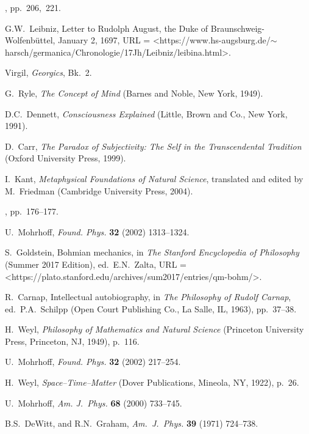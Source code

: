 \documentclass[smallextended]{svjour3}
\begin{document}
\begin{thebibliography}{99}
 \cite{Falk2007}, pp.\ 206,~221.

 G.W.\ Leibniz, Letter to Rudolph August, the Duke of Braunschweig-Wolfenb\"uttel, January 2, 1697, URL = \textless https://www.hs-augsburg.de/$\sim$harsch/germanica/\break Chronologie/17Jh/Leibniz/lei\textunderscore bina.html\textgreater.

 Virgil, \emph{Georgics}, Bk.~2.

 G.\ Ryle, \textit{The Concept of Mind} (Barnes and Noble, New York, 1949).

 D.C.\ Dennett, \textit{Consciousness Explained} (Little, Brown and Co., New York, 1991).

 D.\ Carr, \textit{The Paradox of Subjectivity: The Self in the Transcendental Tradition} (Oxford University Press, 1999).

 I.\ Kant, \textit{Metaphysical Foundations of Natural Science}, translated and edited by M.\ Friedman (Cambridge University Press, 2004).

 \cite{vW}, pp.\ 176--177.

 U.\ Mohrhoff, \emph{Found. Phys.} \textbf{32} (2002) 1313--1324.

 S.\ Goldstein, Bohmian mechanics, in \textit{The Stanford Encyclopedia of Philosophy} (Summer 2017 Edition), ed.\ E.N.\ Zalta, URL = \textless https://plato.stanford.edu/archives/\break sum2017/entries/qm-bohm/\textgreater.

 R.\ Carnap, Intellectual autobiography, in \emph{The Philosophy of Rudolf Carnap}, ed.\ P.A.\ Schilpp (Open Court Publishing Co., La Salle, IL, 1963), pp.\ 37--38. 

 H.\ Weyl, \emph{Philosophy of Mathematics and Natural Science} (Princeton University Press, Princeton, NJ, 1949), p.~116.

 U.\ Mohrhoff, \emph{Found. Phys.} \textbf{32} (2002) 217--254.

 H.\ Weyl, \textit{Space--Time--Matter} (Dover Publications, Mineola, NY, 1922), p.~26.

 U.\ Mohrhoff, \emph{Am. J.\ Phys.} \textbf{68} (2000) 733--745.

 B.S.\ DeWitt, and R.N.\ Graham, \textit{Am.\ J.\ Phys.} \textbf{39} (1971) 724--738.

\end{thebibliography}
\end{document}
